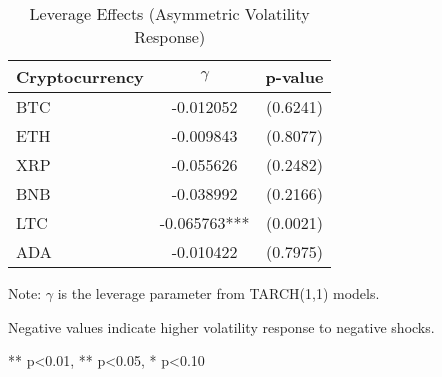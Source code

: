 
\begin{table}[htbp]
\centering
\caption{Leverage Effects (Asymmetric Volatility Response)}
\label{tab:leverage}
\begin{tabular}{lcc}
\hline
\hline
Cryptocurrency & $\gamma$ & p-value \\
\hline
BTC & -0.012052 & (0.6241) \\
ETH & -0.009843 & (0.8077) \\
XRP & -0.055626 & (0.2482) \\
BNB & -0.038992 & (0.2166) \\
LTC & -0.065763*** & (0.0021) \\
ADA & -0.010422 & (0.7975) \\
\hline
\hline
\end{tabular}
\begin{tablenotes}
\small
\item Note: $\gamma$ is the leverage parameter from TARCH(1,1) models.
\item Negative values indicate higher volatility response to negative shocks.
\item *** p<0.01, ** p<0.05, * p<0.10
\end{tablenotes}
\end{table}
